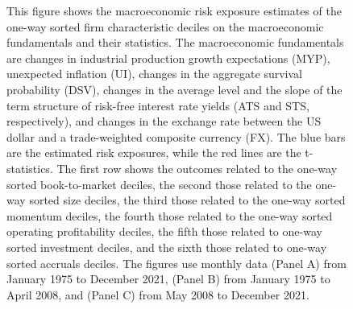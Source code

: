 \documentclass[11pt,halfline,a4paper]{ouparticle}
\begin{document}
\begin{figure}
  \caption{This figure shows the macroeconomic risk exposure estimates of the one-way sorted firm characteristic deciles on the macroeconomic fundamentals and their statistics. The macroeconomic fundamentals are changes in industrial production growth expectations (MYP), unexpected inflation (UI), changes in the aggregate survival probability (DSV), changes in the average level and the slope of the term structure of risk-free interest rate yields (ATS and STS, respectively), and changes in the exchange rate between the US dollar and a trade-weighted composite currency (FX). The blue bars are the estimated risk exposures, while the red lines are the t-statistics. The first row shows the outcomes related to the one-way sorted book-to-market deciles, the second those related to the one-way sorted size deciles, the third those related to the one-way sorted momentum deciles, the fourth those related to the one-way sorted operating profitability deciles, the fifth those related to one-way sorted investment deciles, and the sixth those related to one-way sorted accruals deciles. The figures use monthly data (Panel A) from January 1975 to December 2021, (Panel B) from January 1975 to April 2008, and (Panel C) from May 2008 to December 2021.}
\end{figure}

\newpage
\end{document}
